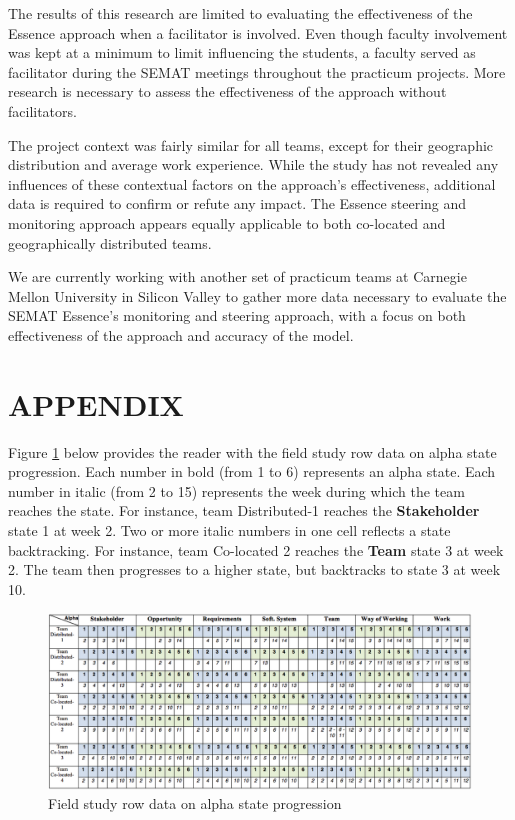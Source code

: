 The results of this research are limited to evaluating the effectiveness of the Essence approach when a facilitator is involved. Even though faculty involvement was kept at a minimum to limit influencing the students, a faculty served as facilitator during the SEMAT meetings throughout the practicum projects. More research is necessary to assess the effectiveness of the approach without facilitators.

The project context was fairly similar for all teams, except for their geographic distribution and average work experience. While the study has not revealed any influences of these contextual factors on the approach's effectiveness, additional data is required to confirm or refute any impact. The Essence steering and monitoring approach appears equally applicable to both co-located and geographically distributed teams.

We are currently working with another set of practicum teams at Carnegie Mellon University in Silicon Valley to gather more data necessary to evaluate the SEMAT Essence's monitoring and steering approach, with a focus on both effectiveness of the approach and accuracy of the model.

\section{APPENDIX}
Figure \ref{FieldStudyRowData} below provides the reader with the field study row data on alpha state progression. Each number in bold (from 1 to 6) represents an alpha state. Each number in italic (from 2 to 15) represents the week during which the team reaches the state. For instance, team Distributed-1 reaches the \textbf{Stakeholder} state 1 at week 2. Two or more italic numbers in one cell reflects a state backtracking. For instance, team Co-located 2 reaches the \textbf{Team} state 3 at week 2. The team then progresses to a higher state, but backtracks to state 3 at week 10.

\begin{figure}[h]
\centering
\includegraphics[width=6.80in]{project_steering_images/FieldStudyRowData.png}
\caption{Field study row data on alpha state progression}
\label{FieldStudyRowData}
\end{figure}


